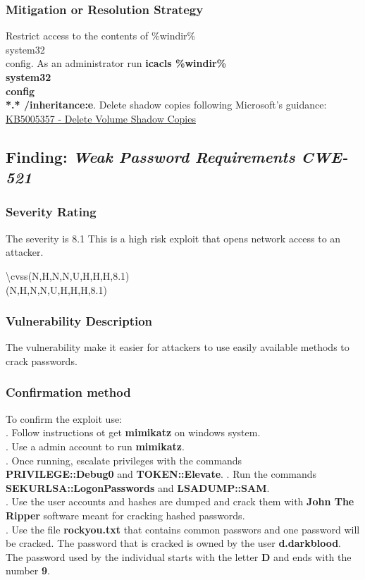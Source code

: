 \documentclass[notitlepage]{article}
\begin{document}
	\subsubsection{Mitigation or Resolution Strategy}
	\indent Restrict access to the contents of \%windir\%\\system32\\config. As an administrator run \textbf{icacls \%windir\%\\system32\\config\\*.* /inheritance:e}.
	Delete shadow copies following Microsoft's guidance:   	\href{https://support.microsoft.com/en-us/topic/kb5005357-delete-volume-shadow-copies-1ceaa637-aaa3-4b58-a48b-baf72a2fa9e72}{KB5005357 - Delete Volume Shadow Copies} \\
	
	\subsection{Finding: \emph{Weak Password Requirements CWE-521}}
	
	\subsubsection{Severity Rating}
	\indent The severity is 8.1 This is a high risk exploit that opens network access to an attacker. 
	
	\textbackslash cvss(N,H,N,N,U,H,H,H,8.1)\\
	\cvss(N,H,N,N,U,H,H,H,8.1) \\
	
	\subsubsection{Vulnerability Description}
	\indent The vulnerability make it easier for attackers to use easily available methods to crack passwords. 
	
	\subsubsection{Confirmation method}
	To confirm the exploit use: \\
	. Follow instructions ot get \textbf{mimikatz} on windows system.\\
	. Use a admin account to run \textbf{mimikatz}.\\
	. Once running, escalate privileges with the commands \\ \textbf{PRIVILEGE::Debug0} and \textbf{TOKEN::Elevate}.
	. Run the commands \textbf{SEKURLSA::LogonPasswords} and  \textbf{LSADUMP::SAM}.\\
	. Use the user accounts and hashes are dumped and crack them with \textbf{John The Ripper} software meant for cracking hashed passwords.  \\
	. Use the file \textbf{rockyou.txt} that contains common passwors and one password will be cracked. The password that is cracked is owned by the user \textbf{d.darkblood}. The password used by the individual starts with the letter \textbf{D} and ends with the number \textbf{9}.  \\
	
\end{document}
